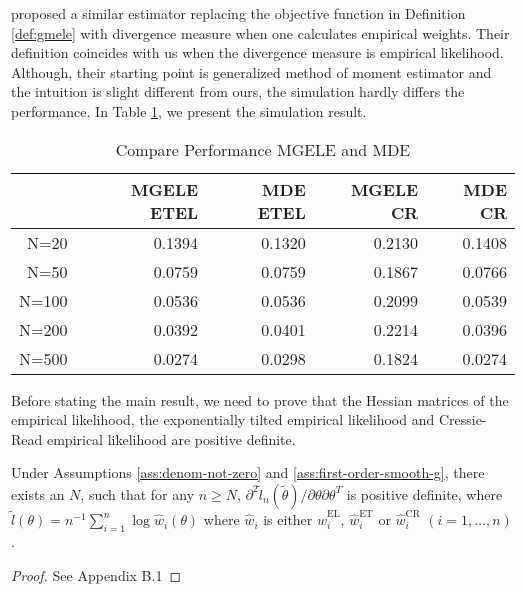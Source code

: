 \citet{newey2004higher} proposed a similar estimator replacing the
objective function in Definition \ref{def:gmele} with divergence
measure when one calculates empirical weights. Their definition coincides
with us when the divergence measure is empirical likelihood. Although,
their starting point is generalized method of moment estimator and
the intuition is slight different from ours, the simulation hardly differs
the performance. In Table \ref{tab:mgele-mde}, we present the simulation
result. 
\begin{table}
\centering
\begin{tabular}{rrrrr}
  \hline
 & MGELE ETEL & MDE ETEL & MGELE CR & MDE CR \\ 
  \hline
N=20 & 0.1394 & 0.1320 & 0.2130 & 0.1408 \\
   N=50 & 0.0759 & 0.0759 & 0.1867 & 0.0766 \\
   N=100 & 0.0536 & 0.0536 & 0.2099 & 0.0539 \\
   N=200 & 0.0392 & 0.0401 & 0.2214 & 0.0396 \\
   N=500 & 0.0274 & 0.0298 & 0.1824 & 0.0274 \\
    \hline
\end{tabular}
\caption{\label{tab:mgele-mde}Compare Performance MGELE and MDE}
\end{table}


Before stating the main result, 
we need to prove that the Hessian matrices of the empirical likelihood, the exponentially tilted empirical likelihood and Cressie-Read empirical likelihood are positive definite.

\begin{lem}
\label{lem:pd-sample-var-2}
Under  Assumptions \ref{ass:denom-not-zero} and \ref{ass:first-order-smooth-g}, 
there exists an $N$, 
such that for any $n\ge N$,
${\partial^{2}\tilde{l}_n\left(\tilde{\theta} \right)} / {\partial\theta \partial\theta^T}$ is positive definite,
where $\tilde{l}\left(\theta\right)=n^{-1}\sum_{i=1}^{n}\log\hat{w}_{i}\left(\theta\right)$
where $\hat{w}_{i}$ is either $\hat{w}_{i}^{\mathrm{EL}}$, $\hat{w}_{i}^{\mathrm{ET}}$
or $\hat{w}_{i}^{\mathrm{CR}}$ $\left(i=1,\ldots,n\right)$.
\end{lem}

\begin{proof}
	See Appendix B.1 
\end{proof}



